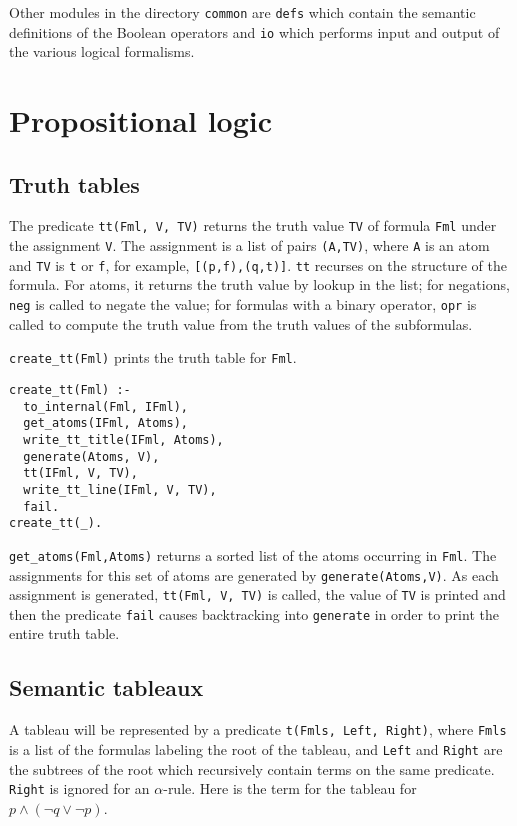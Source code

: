 \documentclass[11pt]{article}
\newcommand*{\p}[1]{\textup{\texttt{#1}}}
\begin{document}
Other modules in the directory \p{common} are \p{defs} which contain the
semantic definitions of the Boolean operators and \p{io} which performs
input and output of the various logical formalisms. 



\section{Propositional logic}

\subsection{Truth tables}\label{s.tt}

The predicate \p{tt(Fml, V, TV)} returns the truth value \p{TV} of
formula \p{Fml} under the assignment \p{V}. The assignment is a list of
pairs \p{(A,TV)}, where \p{A} is an atom and \p{TV} is \p{t} or \p{f},
for example, \p{[(p,f),(q,t)]}. \p{tt} recurses on the structure of the
formula. For atoms, it returns the truth value by lookup in the list;
for negations, \p{neg} is called to negate the value; for formulas with
a binary operator, \p{opr} is called to compute the truth value from the
truth values of the subformulas.

\p{create\_tt(Fml)} prints the truth table for \p{Fml}.
\begin{verbatim}
create_tt(Fml) :-
  to_internal(Fml, IFml),
  get_atoms(IFml, Atoms),
  write_tt_title(IFml, Atoms),
  generate(Atoms, V),
  tt(IFml, V, TV),
  write_tt_line(IFml, V, TV),
  fail.
create_tt(_).
\end{verbatim}

\p{get\_atoms(Fml,Atoms)} returns a sorted list of the atoms occurring
in \p{Fml}. The assignments for this set of atoms are generated by
\p{generate(Atoms,V)}. As each assignment is generated, \p{tt(Fml, V,
TV)} is called, the value of \p{TV} is printed and then the predicate
\p{fail} causes backtracking into \p{generate} in order to print the
entire truth table.



\subsection{Semantic tableaux}\label{s.tabprop}

A tableau will be represented by a predicate \p{t(Fmls, Left, Right)},
where \p{Fmls} is a list of the formulas labeling the root of the
tableau, and \p{Left} and \p{Right} are the subtrees of the root which
recursively contain terms on the same predicate. \p{Right} is ignored
for an $\alpha$-rule. Here is the term for the tableau for $p \wedge
(\neg q \vee \neg p)$.
\end{document}
